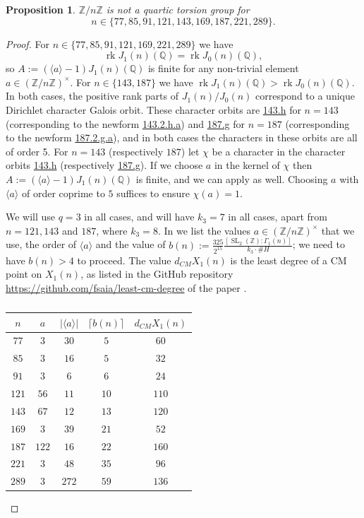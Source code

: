 \documentclass[11pt,reqno]{amsart}
\DeclareMathOperator{\rk}{rk}
\DeclareMathOperator{\SL}{SL}
\newtheorem{proposition}[theorem]{Proposition}
\theoremstyle{definition}
\numberwithin{equation}{section}
\newcommand{\Q}{\mathbb{Q}}
\def\torz#1{\mathbb Z /#1 \mathbb Z}
\newcommand{\diamondop}[1]{\langle #1 \rangle} %
\newcommand{\lmfdcharorbit}[2]{\href{https://www.lmfdb.org/Character/Dirichlet/#1/#2}{#1.#2}}
\newcommand{\lmfdbnewform}[4]{\href{https://www.lmfdb.org/ModularForm/GL2/Q/holomorphic/#1/#2/#3/#4}{#1.#2.#3.#4}}
\begin{document}
\begin{proposition} \label{prop:global_argument}
    $\torz{n}$ is not a quartic torsion group for 
    $$n\in \{77, 85,91,121, 143,169, 187, 221, 289\}.$$
\end{proposition}
\begin{proof}
    For $n\in\{77,85,91, 121, 169, 221, 289\}$ we have $$\rk J_1(n)(\Q)=\rk J_0(n)(\Q),$$ so $A:=(\diamondop{a}-1)J_1(n)(\Q)$ is finite for any non-trivial element $a\in (\torz{n})^\times$. For $n\in\{143,187\}$ we have $\rk J_1(n)(\Q)>\rk J_0(n)(\Q)$. In both cases, the positive rank parts of $J_1(n)/J_0(n)$ correspond to a unique Dirichlet character Galois orbit. These character orbits are \lmfdcharorbit{143}{h} for $n=143$ (corresponding to the newform \lmfdbnewform{143}{2}{h}{a}) and \lmfdcharorbit{187}{g} for $n=187$ (corresponding to the newform \lmfdbnewform{187}{2}{g}{a}), and in both cases the characters in these orbits are all of order 5. For $n=143$ (respectively $187$) let $\chi$ be a character in the character orbits \lmfdcharorbit{143}{h} (respectively \lmfdcharorbit{187}{g}). If we choose $a$ in the kernel of $\chi$ then $A:=(\diamondop{a}-1)J_1(n)(\Q)$ is finite, and we can apply  as well. Choosing $a$ with $\diamondop{a}$ of order coprime to $5$ suffices to ensure $\chi(a)=1$. 
    
    
    We will use $q=3$ in all cases, and will have $k_3=7$ in all cases, apart from $n=121,143$ and $187$, where $k_3=8$. In  we list the values $a \in (\torz{n})^\times $ that we use, the order of $\diamondop{a}$ and the value of  $b(n):=\frac {325} {2^{15}}\frac{[\SL_2(\mathbb Z) :\Gamma_1(n)]}{k_3 \cdot \#H}$; we need to have $b(n)> 4$ to proceed. The value $d_{CM}X_1(n) $ is the least degree of a CM point on $X_1(n)$, as listed in the GitHub repository \url{https://github.com/fsaia/least-cm-degree} of the paper \cite{CGPS22}.
    
\begin{table}[H]
\centering
\begin{tabular}{c|c|c|c|c}
$n$ & $a$ & $|\diamondop{a}|$ & $\lceil b(n)\rceil $ &  $d_{CM}X_1(n) $ \\ 
\hline
$77$  & $3$   & $30$ & $5$  & $60$  \\
$85$  & $3$   & $16$  & $5$  & $32$  \\
$91$  & $3$  & $6$  & $6$  & $24$  \\
$121$ & $56$  & $11$ & $10$ & $110$ \\
$143$ & $67$  & $12$ & $13$ & $120$ \\
$169$ & $3$  & $39$  & $21$ & $52$  \\
$187$ & $122$ & $16$ & $22$ & $160$ \\
$221$ & $3$  & $48$  & $35$ & $96$  \\
$289$ & $3$ & $272$  & $59$ & $136$ \\
\end{tabular}
\caption{}\label{table:DS}
\end{table}


\end{proof}
\end{document}
